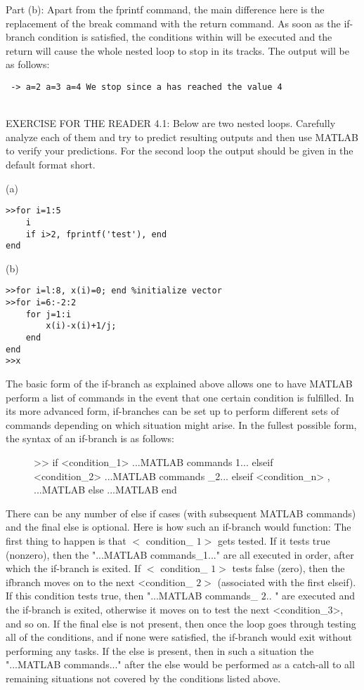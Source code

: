 \documentclass[../main.tex]{subfiles}
\begin{document}
Part (b): Apart from the fprintf command, the main difference here is the replacement of the break command with the return command. As soon as the if-branch condition is satisfied, the conditions within will be executed and the return will cause the whole nested loop to stop in its tracks. The output will be as follows:\\

\begin{verbatim} -> a=2 a=3 a=4 We stop since a has reached the value 4\end{verbatim}\\

EXERCISE FOR THE READER 4.1: Below are two nested loops. Carefully analyze each of them and try to predict resulting outputs and then use MATLAB to verify your predictions. For the second loop the output should be given in the default format short.

(a)
\begin{verbatim}
>>for i=1:5
	i
	if i>2, fprintf('test'), end
end
\end{verbatim}

(b)
\begin{verbatim}
>>for i=l:8, x(i)=0; end %initialize vector
>>for i=6:-2:2
	for j=1:i
		x(i)-x(i)+1/j;
	end
end
>>x
\end{verbatim}
The basic form of the if-branch as explained above allows one to have MATLAB
perform a list of commands in the event that one certain condition is fulfilled. In
its more advanced form, if-branches can be set up to perform different sets of
commands depending on which situation might arise. In the fullest possible form,
the syntax of an if-branch is as follows: 

\begin{figure}[H]
\centering
\begin{boxedverbatim}
>> if <condition_1>
...MATLAB commands 1...
elseif <condition_2>
...MATLAB commands _2...
elseif <condition_n> ,
...MATLAB
else
...MATLAB
end 
\end{boxedverbatim}
\end{figure}

There can be any number of else if cases (with subsequent MATLAB commands) and the final else is optional. Here is how such an if-branch would function: The first thing to happen is that $<$ condition\_ $1>$ gets tested. If it tests true (nonzero), then the "...MATLAB commands\_1..." are all executed in order, after which the if-branch is exited. If $<$ condition\_ $1>$ tests false (zero), then the ifbranch moves on to the next <condition\_ $2>$ (associated with the first elseif). If this condition tests true, then "...MATLAB commands\_ $2 . .$ " are executed and the if-branch is exited, otherwise it moves on to test the next <condition\_3>, and so on. If the final else is not present, then once the loop goes through testing all of the conditions, and if none were satisfied, the if-branch would exit without performing any tasks. If the else is present, then in such a situation the "...MATLAB commands..." after the else would be performed as a catch-all to all remaining situations not covered by the conditions listed above.\\
\end{document}
